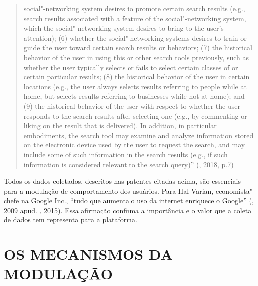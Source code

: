 \begin{quote}
{  social"-networking system desires to promote certain search results
  (e.g., search results associated with a feature of the
  social"-networking system, which the social"-networking system desires
  to bring to the user's attention); (6) whether the social"-networking
  systems desires to train or guide the user toward certain search
  results or behaviors; (7) the historical behavior of the user in using
  this or other search tools previously, such as whether the user
  typically selects or fails to select certain classes of or certain
  particular results; (8) the historical behavior of the user in certain
  locations (e.g., the user always selects results referring to people
  while at home, but selects results referring to businesses while not
  at home); and (9) the historical behavior of the user with respect to
  whether the user responds to the search results after selecting one
  (e.g., by commenting or liking on the result that is delivered). In
  addition, in particular embodiments, the search tool may examine and
  analyze information stored on the electronic device used by the user
  to request the search, and may include some of such information in the
  search results (e.g., if such information is considered relevant to
  the search query)''} (, 2018, p.7)
\end{quote}

Todos os dados coletados, descritos nas patentes citadas acima, são
essenciais para a modulação de comportamento dos usuários. Para Hal
Varian, economista"-chefe na Google Inc., ``tudo que aumenta o uso da
internet enriquece o Google'' (, 2009 apud. , 2015). Essa
afirmação confirma a importância e o valor que a coleta de dados tem
representa para a plataforma.

\section{OS MECANISMOS DA MODULAÇÃO}

